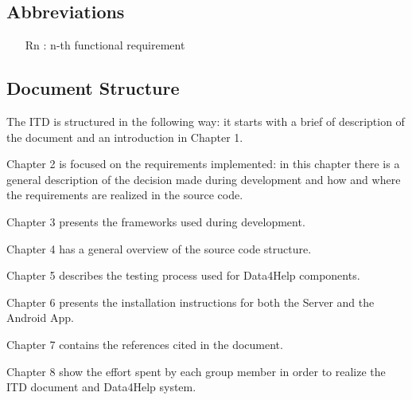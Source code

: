 \subsection{Abbreviations}
\begin{itemize}
\item[Rn]: n-th functional requirement
\end{itemize}

\subsection{Document Structure}

The ITD is structured in the following way:
it starts with a brief of description of the document and an introduction in Chapter 1.

\bigskip\noindent
Chapter 2 is focused on the requirements implemented: in this chapter there is a general description of the decision made during development and how and where the requirements are realized in the source code.

\bigskip\noindent
Chapter 3 presents the frameworks used during development.

\bigskip\noindent
Chapter 4 has a general overview of the source code structure.

\bigskip\noindent
Chapter 5 describes the testing process used for Data4Help components.

\bigskip\noindent
Chapter 6 presents the installation instructions for both the Server and the Android App.

\bigskip\noindent
Chapter 7 contains the references cited in the document.

\bigskip\noindent
Chapter 8 show the effort spent by each group member in order to realize the ITD document and Data4Help system.